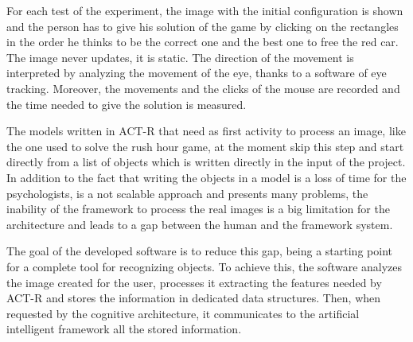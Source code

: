 	For each test of the experiment, the image with the initial configuration is shown and the person has to give his solution of the game by clicking on the rectangles in the order he thinks to be the correct one and the best one to free the red car. The image never updates, it is static. The direction of the movement is interpreted by analyzing the movement of the eye, thanks to a software of eye tracking. Moreover, the movements and the clicks of the mouse are recorded and the time needed to give the solution is measured. 

	The models written in ACT-R that need as first activity to process an image, like the one used to solve the rush hour game, at the moment skip this step and start directly from a list of objects which is written directly in the input of the project. 
	In addition to the fact that writing the objects in a model is a loss of time for the psychologists, is a not scalable approach and presents many problems, the inability of the framework to process the real images is a big limitation for the architecture and leads to a gap between the human and the framework system.
	
	The goal of the developed software is to reduce this gap, being a starting point for a complete  tool for recognizing objects. To achieve this, the software analyzes the image created for the user, processes it extracting the features needed by ACT-R and stores the information in dedicated data structures. Then, when requested by the cognitive architecture, it communicates to the artificial intelligent framework all the stored information.

